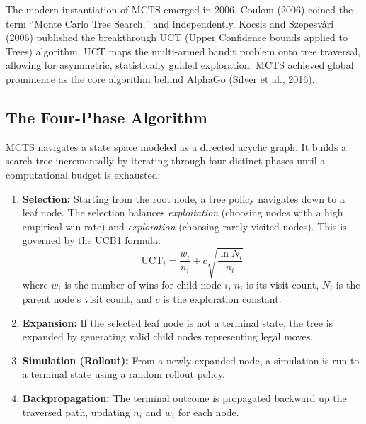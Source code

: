 \documentclass[12pt,a4paper]{article}
\begin{document}
The modern instantiation of MCTS emerged in 2006. Coulom (2006) coined the term ``Monte Carlo Tree Search,'' and independently, Kocsis and Szepesv\'ari (2006) published the breakthrough UCT (Upper Confidence bounds applied to Trees) algorithm. UCT maps the multi-armed bandit problem onto tree traversal, allowing for asymmetric, statistically guided exploration. MCTS achieved global prominence as the core algorithm behind AlphaGo (Silver et al., 2016).

\subsection{The Four-Phase Algorithm}
MCTS navigates a state space modeled as a directed acyclic graph. It builds a search tree incrementally by iterating through four distinct phases until a computational budget is exhausted:

\begin{enumerate}
    \item \textbf{Selection:} Starting from the root node, a tree policy navigates down to a leaf node. The selection balances \textit{exploitation} (choosing nodes with a high empirical win rate) and \textit{exploration} (choosing rarely visited nodes). This is governed by the UCB1 formula:
    \begin{equation}
        \text{UCT}_i = \frac{w_i}{n_i} + c \sqrt{\frac{\ln N_i}{n_i}}
    \end{equation}
    where $w_i$ is the number of wins for child node $i$, $n_i$ is its visit count, $N_i$ is the parent node's visit count, and $c$ is the exploration constant.
    \item \textbf{Expansion:} If the selected leaf node is not a terminal state, the tree is expanded by generating valid child nodes representing legal moves.
    \item \textbf{Simulation (Rollout):} From a newly expanded node, a simulation is run to a terminal state using a random rollout policy.
    \item \textbf{Backpropagation:} The terminal outcome is propagated backward up the traversed path, updating $n_i$ and $w_i$ for each node.
\end{enumerate}
\end{document}
